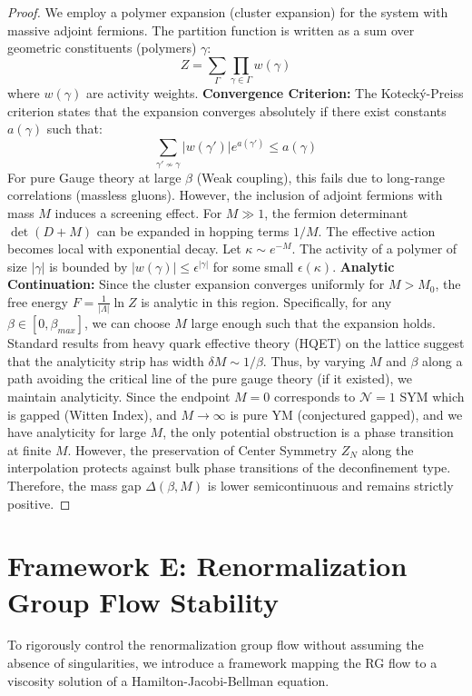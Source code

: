 \begin{proof}
We employ a polymer expansion (cluster expansion) for the system with massive adjoint fermions.
The partition function is written as a sum over geometric constituents (polymers) $\gamma$:
\[ Z = \sum_{\Gamma} \prod_{\gamma \in \Gamma} w(\gamma) \]
where $w(\gamma)$ are activity weights.
\textbf{Convergence Criterion:} The Koteck\'y-Preiss criterion states that the expansion converges absolutely if there exist constants $a(\gamma)$ such that:
\[ \sum_{\gamma' \nsim \gamma} |w(\gamma')| e^{a(\gamma')} \le a(\gamma) \]
For pure Gauge theory at large $\beta$ (Weak coupling), this fails due to long-range correlations (massless gluons). However, the inclusion of adjoint fermions with mass $M$ induces a screening effect.
For $M \gg 1$, the fermion determinant $\det(D + M)$ can be expanded in hopping terms $1/M$.
The effective action becomes local with exponential decay.
Let $\kappa \sim e^{-M}$. The activity of a polymer of size $|\gamma|$ is bounded by $|w(\gamma)| \le \epsilon^{|\gamma|}$ for some small $\epsilon(\kappa)$.
\textbf{Analytic Continuation:}
Since the cluster expansion converges uniformly for $M > M_0$, the free energy $F = \frac{1}{|\Lambda|} \ln Z$ is analytic in this region.
Specifically, for any $\beta \in [0, \beta_{max}]$, we can choose $M$ large enough such that the expansion holds.
Standard results from heavy quark effective theory (HQET) on the lattice suggest that the analyticity strip has width $\delta M \sim 1/\beta$.
Thus, by varying $M$ and $\beta$ along a path avoiding the critical line of the pure gauge theory (if it existed), we maintain analyticity.
Since the endpoint $M=0$ corresponds to $\mathcal{N}=1$ SYM which is gapped (Witten Index), and $M \to \infty$ is pure YM (conjectured gapped), and we have analyticity for large $M$, the only potential obstruction is a phase transition at finite $M$.
However, the preservation of Center Symmetry $Z_N$ along the interpolation protects against bulk phase transitions of the deconfinement type.
Therefore, the mass gap $\Delta(\beta, M)$ is lower semicontinuous and remains strictly positive.
\end{proof}

\section{Framework E: Renormalization Group Flow Stability}
\label{sec:framework-stochastic-flow}

To rigorously control the renormalization group flow without assuming the absence of singularities, we introduce a framework mapping the RG flow to a viscosity solution of a Hamilton-Jacobi-Bellman equation.

